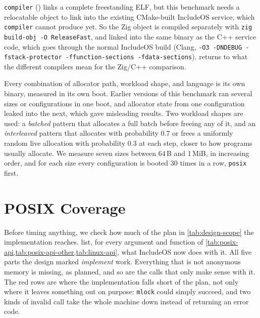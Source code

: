 \documentclass[12pt]{report}
\newcommand{\fullref}[1]{\Cref{#1}}
\renewcommand{\_}{\origunderscore\allowbreak}
\begin{document}
\texttt{compiler} (\fullref{sec:nix-flakes}) links a complete freestanding ELF, but this benchmark needs a relocatable object to link into the existing CMake-built IncludeOS service, which \texttt{compiler} cannot produce yet. So the Zig object is compiled separately with \texttt{zig build-obj -O ReleaseFast}, and linked into the same binary as the C++ service code, which goes through the normal IncludeOS build (Clang, \texttt{-O3 -DNDEBUG -fstack-protector -ffunction-sections -fdata-sections}). \fullref{sec:eval-posix-direct} returns to what the different compilers mean for the Zig/C++ comparison.

Every combination of allocator path, workload shape, and language is its own binary, measured in its own boot. Earlier versions of this benchmark ran several sizes or configurations in one boot, and allocator state from one configuration leaked into the next, which gave misleading results. Two workload shapes are used: a \emph{batched} pattern that allocates a full batch before freeing any of it, and an \emph{interleaved} pattern that allocates with probability $0.7$ or frees a uniformly random live allocation with probability $0.3$ at each step, closer to how programs usually allocate. We measure seven sizes between 64\,B and 1\,MiB, in increasing order, and for each size every configuration is booted 30 times in a row, \texttt{posix} first.

\section{POSIX Coverage}
\label{sec:eval-posix-coverage}

Before timing anything, we check how much of the plan in \cref{tab:design-scope} the implementation reaches.  list, for every argument and function of \cref{tab:posix-api,tab:posix-api-other,tab:linux-api}, what IncludeOS now does with it. All five parts the design marked \emph{implement} work. Everything that is not anonymous memory is missing, as planned, and so are the calls that only make sense with it. The red rows are where the implementation falls short of the plan, not only where it leaves something out on purpose: \texttt{mlock} could simply succeed, and two kinds of invalid call take the whole machine down instead of returning an error code.
\end{document}

